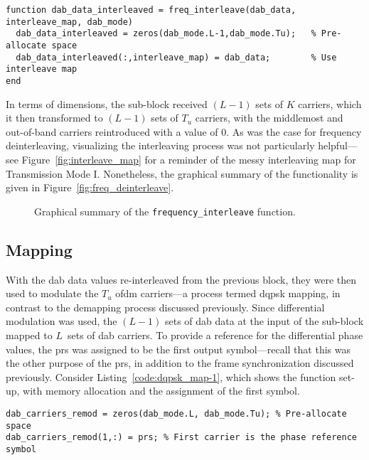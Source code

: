 \documentclass[class=report,11pt,crop=false]{standalone}
\begin{document}
\begin{lstlisting}[caption={\textsc{Matlab} code for the frequency interleaving functionality.},label={code:freq_interleave}]
function dab_data_interleaved = freq_interleave(dab_data, interleave_map, dab_mode)
  dab_data_interleaved = zeros(dab_mode.L-1,dab_mode.Tu);   % Pre-allocate space
  dab_data_interleaved(:,interleave_map) = dab_data;        % Use interleave map
end
\end{lstlisting}

In terms of dimensions, the sub-block received \((L-1)\) sets of \(K\) carriers, which it then transformed to \((L-1)\) sets of \(T_u\) carriers, with the middlemost and out-of-band carriers reintroduced with a value of 0. As was the case for frequency deinterleaving, visualizing the interleaving process was not particularly helpful---see Figure~\ref{fig:interleave_map} for a reminder of the messy interleaving map for Transmission Mode I. Nonetheless, the graphical summary of the functionality is given in Figure~\ref{fig:freq_deinterleave}.

\begin{figure}[htbp]
  \centering
  \captionsetup{type=figure}
  \def\svgwidth{\linewidth}
  { %
  }
  \caption{Graphical summary of the \texttt{frequency\_interleave} function.}
  \label{fig:freq_interleave}
\end{figure}

\subsection{ Mapping \label{subsect:dab-proc_dqpsk-map}}
With the \gls{dab} data values re-interleaved from the previous block, they were then used to modulate the \(T_u\) \gls{ofdm} carriers---a process termed \gls{dqpsk} mapping, in contrast to the demapping process discussed previously. Since differential modulation was used, the \((L-1)\) sets of \gls{dab} data at the input of the sub-block mapped to \(L\)~sets of \gls{dab} carriers. To provide a reference for the differential phase values, the \gls{prs} was assigned to be the first output symbol---recall that this was the other purpose of the \gls{prs}, in addition to the frame synchronization discussed previously. Consider Listing~\ref{code:dqpsk_map-1}, which shows the function set-up, with memory allocation and the assignment of the first symbol.

\begin{lstlisting}[caption={\textsc{Matlab} code for setting up the \texttt{dqpsk\_map} function.},label={code:dqpsk_map-1}]
dab_carriers_remod = zeros(dab_mode.L, dab_mode.Tu); % Pre-allocate space
dab_carriers_remod(1,:) = prs; % First carrier is the phase reference symbol
\end{lstlisting}
\end{document}
